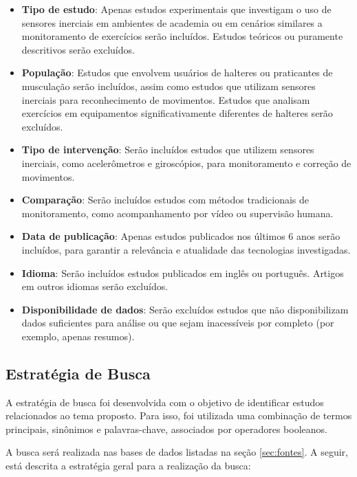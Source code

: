 \documentclass[conference]{IEEEtran}
\begin{document}
\begin{itemize}
    \item \textbf{Tipo de estudo}: Apenas estudos experimentais que investigam o uso de sensores inerciais em ambientes de academia ou em cenários similares a monitoramento de exercícios serão incluídos. Estudos teóricos ou puramente descritivos serão excluídos.
    \item \textbf{População}: Estudos que envolvem usuários de halteres ou praticantes de musculação serão incluídos, assim como estudos que utilizam sensores inerciais para reconhecimento de movimentos. Estudos que analisam exercícios em equipamentos significativamente diferentes de halteres serão excluídos.
    \item \textbf{Tipo de intervenção}: Serão incluídos estudos que utilizem sensores inerciais, como acelerômetros e giroscópios, para monitoramento e correção de movimentos.
    \item \textbf{Comparação}: Serão incluídos estudos com métodos tradicionais de monitoramento, como acompanhamento por vídeo ou supervisão humana.
    \item \textbf{Data de publicação}: Apenas estudos publicados nos últimos 6 anos serão incluídos, para garantir a relevância e atualidade das tecnologias investigadas.
    \item \textbf{Idioma}: Serão incluídos estudos publicados em inglês ou português. Artigos em outros idiomas serão excluídos.
    \item \textbf{Disponibilidade de dados}: Serão excluídos estudos que não disponibilizam dados suficientes para análise ou que sejam inacessíveis por completo (por exemplo, apenas resumos).
\end{itemize}

\subsection{Estratégia de Busca}
A estratégia de busca foi desenvolvida com o objetivo de identificar estudos relacionados ao tema proposto. Para isso, foi utilizada uma combinação de termos principais, sinônimos e palavras-chave, associados por operadores booleanos.

A busca será realizada nas bases de dados listadas na seção \ref{sec:fontes}. A seguir, está descrita a estratégia geral para a realização da busca:
\end{document}
